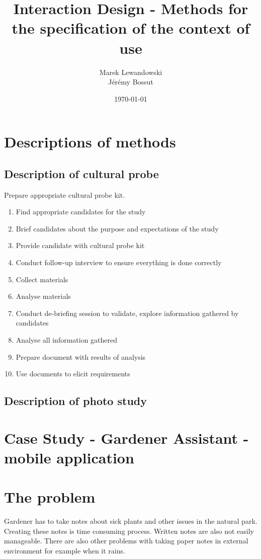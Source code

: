 \documentclass[12pt, a4paper]{article}
\author{Marek Lewandowski \\ Jérémy Bossut}
\date{\today}
\title{Interaction Design - Methods for the specification of the context of use}
\begin{document}
\maketitle
\newpage

\section{Descriptions of methods}

\subsection{Description of cultural probe}

Prepare appropriate cultural probe kit.

\begin{enumerate}
\item Find appropriate candidates for the study
\item Brief candidates about the purpose and expectations of the study
\item Provide candidate with cultural probe kit
\item Conduct follow-up interview to ensure everything is done correctly
\item Collect materials
\item Analyse materials
\item Conduct de-briefing session to validate, explore information gathered by candidates
\item Analyse all information gathered
\item Prepare document with results of analysis
\item Use documents to elicit requirements
\end{enumerate}

\subsection{Description of photo study}


\section{Case Study - Gardener Assistant - mobile application}
\section{The problem}
Gardener has to take notes about sick plants and other issues in the natural park. Creating these notes is time consuming process. Written notes are also not easily manageable. There are also other problems with taking paper notes in external environment for example when it rains.
\end{document}
